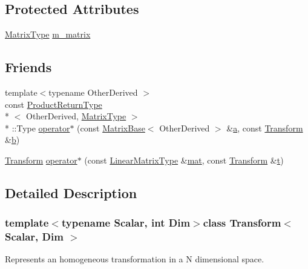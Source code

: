 \subsection*{Protected Attributes}
\begin{DoxyCompactItemize}
\item 
\hyperlink{class_transform_afcdb9f1ab6b63ddfbc52789ef6319f33}{Matrix\-Type} \hyperlink{class_transform_abb6a6fd1638adc58212a935b8b81fa21}{m\-\_\-matrix}
\end{DoxyCompactItemize}
\subsection*{Friends}
\begin{DoxyCompactItemize}
\item 
{\footnotesize template$<$typename Other\-Derived $>$ }\\const \hyperlink{struct_product_return_type}{Product\-Return\-Type}\\*
$<$ Other\-Derived, \hyperlink{class_transform_afcdb9f1ab6b63ddfbc52789ef6319f33}{Matrix\-Type} $>$\\*
\-::Type \hyperlink{class_transform_a065c46264142752bd65c4da084f8e535}{operator$\ast$} (const \hyperlink{class_matrix_base}{Matrix\-Base}$<$ Other\-Derived $>$ \&\hyperlink{glext_8h_ac8729153468b5dcf13f971b21d84d4e5}{a}, const \hyperlink{class_transform}{Transform} \&\hyperlink{glext_8h_a6eba317e3cf44d6d26c04a5a8f197dcb}{b})
\item 
\hyperlink{class_transform}{Transform} \hyperlink{class_transform_a9053c8e48ccd9d8db98049647727fa61}{operator$\ast$} (const \hyperlink{class_transform_ac41e348fcbe528edca0c5e8b1954ba87}{Linear\-Matrix\-Type} \&\hyperlink{uavobjecttemplate_8m_a16a51e808b16c46bbfd36da2e37cd123}{mat}, const \hyperlink{class_transform}{Transform} \&\hyperlink{glext_8h_a00140d6f5c548b26daf170bf16e86a6d}{t})
\end{DoxyCompactItemize}


\subsection{Detailed Description}
\subsubsection*{template$<$typename Scalar, int Dim$>$class Transform$<$ Scalar, Dim $>$}

Represents an homogeneous transformation in a N dimensional space. 



